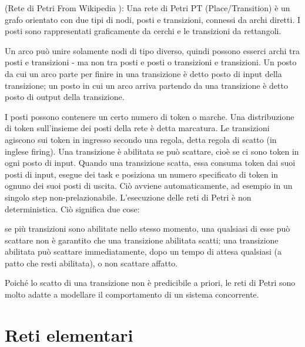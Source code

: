 \begin{definizione} (Rete di Petri From Wikipedia \cite{RetiPetri}):
  Una rete di Petri PT (Place/Transition) è un grafo orientato con due tipi di nodi, posti e transizioni, connessi da archi diretti. I posti sono rappresentati graficamente da cerchi e le transizioni da rettangoli.

Un arco può unire solamente nodi di tipo diverso, quindi possono esserci archi tra posti e transizioni - ma non tra posti e posti o transizioni e transizioni. Un posto da cui un arco parte per finire in una transizione è detto posto di input della transizione; un posto in cui un arco arriva partendo da una transizione è detto posto di output della transizione.

I posti possono contenere un certo numero di token o marche. Una distribuzione di token sull'insieme dei posti della rete è detta marcatura. Le transizioni agiscono sui token in ingresso secondo una regola, detta regola di scatto (in inglese firing). Una transizione è abilitata se può scattare, cioè se ci sono token in ogni posto di input. Quando una transizione scatta, essa consuma token dai suoi posti di input, esegue dei task e posiziona un numero specificato di token in ognuno dei suoi posti di uscita. Ciò avviene automaticamente, ad esempio in un singolo step non-prelazionabile. L'esecuzione delle reti di Petri è non deterministica. Ciò significa due cose:

    se più transizioni sono abilitate nello stesso momento, una qualsiasi di esse può scattare
    non è garantito che una transizione abilitata scatti; una transizione abilitata può scattare immediatamente, dopo un tempo di attesa qualsiasi (a patto che resti abilitata), o non scattare affatto.

Poiché lo scatto di una transizione non è predicibile a priori, le reti di Petri sono molto adatte a modellare il comportamento di un sistema concorrente. 
\end{definizione} \vspace{5mm} %

\section{Reti elementari}


